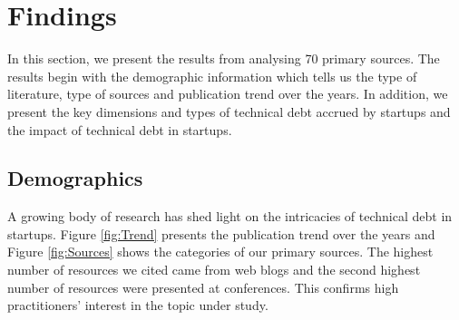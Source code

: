 \section{Findings}\label{Sec:Results}
In this section, we present the results from analysing 70 primary sources.
The results begin with the demographic information which tells us the type of literature, type of sources and publication trend over the years.
In addition, we present the key dimensions and types of technical debt accrued by startups and the impact of technical debt in startups.

\subsection{Demographics}
A growing body of research has shed light on the intricacies of technical debt in startups.
Figure \ref{fig:Trend} presents the publication trend over the years and Figure \ref{fig:Sources} shows the categories of our primary sources.
The highest number of resources we cited came from web blogs and the second highest number of resources were presented at conferences.
This confirms high practitioners' interest in the topic under study.


